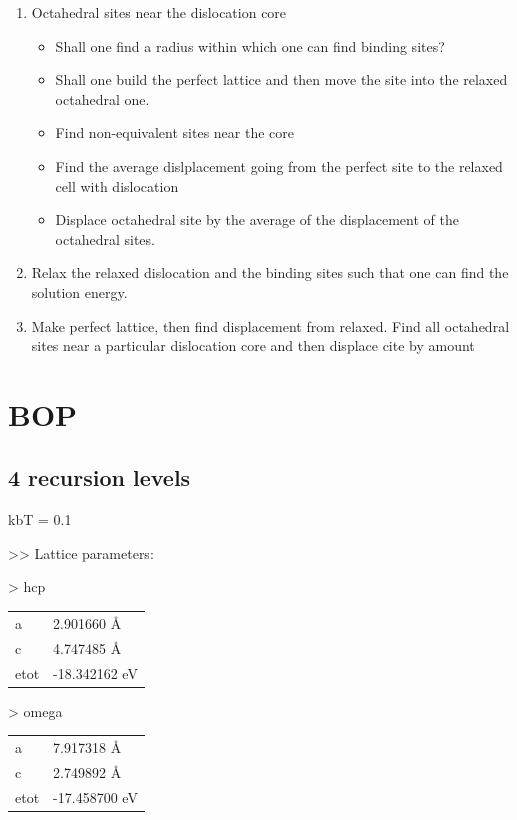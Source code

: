 \documentclass[11pt]{article}
\begin{document}
\begin{enumerate}
\item Octahedral sites near the dislocation core
\begin{itemize}
\item Shall one find a radius within which one can find binding
sites?
\item Shall one build the perfect lattice and then move the site
into the relaxed octahedral one.
\item Find non-equivalent sites near the core
\item Find the average dislplacement going from the perfect site to
the relaxed cell with dislocation
\item Displace octahedral site by the average of the displacement of
the octahedral sites.
\end{itemize}

\item Relax the relaxed dislocation and the binding sites such that one
can find the solution energy.

\item Make perfect lattice, then find displacement from relaxed. Find
all octahedral sites near a particular dislocation core and then
displace cite by amount
\end{enumerate}


\section{BOP}
\label{sec:orgeac4dc4}

\subsection{4 recursion levels}
\label{sec:orgeeca7c8}

kbT = 0.1

>> Lattice parameters:

> hcp
\begin{center}
\begin{tabular}{ll}
a & 2.901660  \AA{}\\
c & 4.747485  \AA{}\\
etot & -18.342162  eV\\
\end{tabular}
\end{center}

> omega
\begin{center}
\begin{tabular}{ll}
a & 7.917318  \AA{}\\
c & 2.749892 \AA{}\\
etot & -17.458700 eV\\
\end{tabular}
\end{center}
\end{document}
